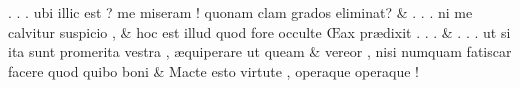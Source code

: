 \documentclass[12pt,onecolumn,twoside,a4paper]{memoir}
\begin{document}
\begin{pairs}
\begin{Leftside}
                              .
                              .
                              .
                              ubi
                              illic
                              est
                              ?
                              me
                              miseram
                              !
                              quonam
                              clam
                              {
                              grados
                              }
                              eliminat? \&
                         \stanza {}.
                              .
                              .
                              {
                              ni
                              }
                              me
                              calvitur
                              suspicio
                              , & 
                     hoc
                              est
                              illud
                              quod
                              fore
                              occulte
                              Œax
                              prædixit
                              .
                              .
                              . \&
                         \stanza {}.
                              .
                              .
                              ut
                              si
                              ita
                              sunt
                              promerita
                              vestra
                              ,
                              æquiperare
                              ut
                              queam & 
                     vereor
                              ,
                              nisi
                              numquam
                              fatiscar
                              facere
                              quod
                              quibo
                              boni \&
                         \stanza {}
                     Macte
                              esto
                              virtute
                              ,
                              operaque
                              {operaque}
                              !

\end{Leftside}
\end{pairs}
\end{document}
